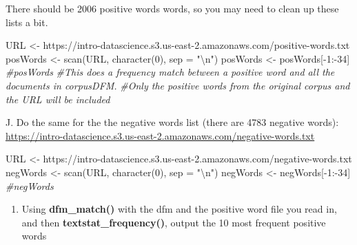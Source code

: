 \documentclass[
]{article}
\newenvironment{Shaded}{\begin{snugshade}}{\end{snugshade}}
\newcommand{\AttributeTok}[1]{\textcolor[rgb]{0.77,0.63,0.00}{#1}}
\newcommand{\CommentTok}[1]{\textcolor[rgb]{0.56,0.35,0.01}{\textit{#1}}}
\newcommand{\DecValTok}[1]{\textcolor[rgb]{0.00,0.00,0.81}{#1}}
\newcommand{\FunctionTok}[1]{\textcolor[rgb]{0.00,0.00,0.00}{#1}}
\newcommand{\NormalTok}[1]{#1}
\newcommand{\OtherTok}[1]{\textcolor[rgb]{0.56,0.35,0.01}{#1}}
\newcommand{\SpecialCharTok}[1]{\textcolor[rgb]{0.00,0.00,0.00}{#1}}
\newcommand{\StringTok}[1]{\textcolor[rgb]{0.31,0.60,0.02}{#1}}
\providecommand{\tightlist}{%
  \setlength{\itemsep}{0pt}\setlength{\parskip}{0pt}}
\begin{document}
There should be 2006 positive words words, so you may need to clean up
these lists a bit.

\begin{Shaded}
\begin{Highlighting}[]
\NormalTok{URL }\OtherTok{\textless{}{-}} \StringTok{\textquotesingle{}https://intro{-}datascience.s3.us{-}east{-}2.amazonaws.com/positive{-}words.txt\textquotesingle{}}
\NormalTok{posWords }\OtherTok{\textless{}{-}} \FunctionTok{scan}\NormalTok{(URL, }\FunctionTok{character}\NormalTok{(}\DecValTok{0}\NormalTok{), }\AttributeTok{sep =} \StringTok{"}\SpecialCharTok{\textbackslash{}n}\StringTok{"}\NormalTok{)}
\NormalTok{posWords }\OtherTok{\textless{}{-}}\NormalTok{ posWords[}\SpecialCharTok{{-}}\DecValTok{1}\SpecialCharTok{:{-}}\DecValTok{34}\NormalTok{]}
\CommentTok{\#posWords}
\CommentTok{\#This does a frequency match between a positive word and all the documents in corpusDFM.}
\CommentTok{\#Only the positive words from the original corpus and the URL will be included}
\end{Highlighting}
\end{Shaded}

J. Do the same for the the negative words list (there are 4783 negative
words):
\url{https://intro-datascience.s3.us-east-2.amazonaws.com/negative-words.txt}

\begin{Shaded}
\begin{Highlighting}[]
\NormalTok{URL }\OtherTok{\textless{}{-}} \StringTok{\textquotesingle{}https://intro{-}datascience.s3.us{-}east{-}2.amazonaws.com/negative{-}words.txt\textquotesingle{}}
\NormalTok{negWords }\OtherTok{\textless{}{-}} \FunctionTok{scan}\NormalTok{(URL, }\FunctionTok{character}\NormalTok{(}\DecValTok{0}\NormalTok{), }\AttributeTok{sep =} \StringTok{"}\SpecialCharTok{\textbackslash{}n}\StringTok{"}\NormalTok{)}
\NormalTok{negWords }\OtherTok{\textless{}{-}}\NormalTok{ negWords[}\SpecialCharTok{{-}}\DecValTok{1}\SpecialCharTok{:{-}}\DecValTok{34}\NormalTok{]}
\CommentTok{\#negWords}
\end{Highlighting}
\end{Shaded}

\begin{enumerate}
\def\labelenumi{\Alph{enumi}.}
\setcounter{enumi}{9}
\tightlist
\item
  Using \textbf{dfm\_match()} with the dfm and the positive word file
  you read in, and then \textbf{textstat\_frequency()}, output the 10
  most frequent positive words
\end{enumerate}
\end{document}
